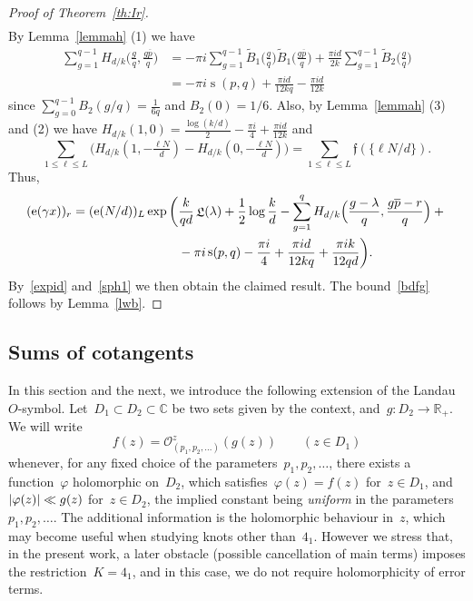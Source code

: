 \documentclass[11pt]{amsart}
\newcommand{\vphi}{\varphi}
\newcommand{\R}{\mathbb{R}}
\newcommand{\C}{\mathbb{C}}
\newcommand{\lf}{{\mathfrak f}}
\theoremstyle{definition}
\newcommand{\pr}[1]{\mathchoice{\left( #1\right)}{(#1)}{(#1)}{(#1)}}
\newcommand{\e}[1][]{\ifthenelse{\equal{#1}{}}{{\rm e}}{\operatorname{e}\pr{ #1}}}
\newcommand{\Oh}{\mathcal{O}}
\DeclareMathOperator{\Lie}{{\mathfrak L}}
\DeclareMathOperator{\deks}{s}
\newcommand{\1}{{\mathbf 1}}
\newcommand{\abs}[1]{\left|#1\right|}
\renewcommand{\bar}[1]{\overline{#1}}
\let\originalleft\left
\let\originalright\right
\renewcommand{\left}{\mathopen{}\mathclose\bgroup\originalleft}
\renewcommand{\right}{\aftergroup\egroup\originalright}
\numberwithin{equation}{section}
\begin{document}
\begin{proof}[Proof of Theorem~\ref{th:Ir}]
\begin{align*}
  \end{align*}
  By Lemma~\ref{lemmah} (1) we have
  \begin{align*}
    \sum_{g=1}^{q-1} H_{d/k}\Big(\frac gq, \frac{g\bar{p}}q\Big)&=-\pi i \sum_{g=1}^{q-1} \tilde B_1\Big(\frac gq\Big)\tilde B_1\Big( \frac{g\bar{p}}q\Big)+\frac{\pi i d}{2 k} \sum_{g=1}^{q-1}\tilde B_2\Big(\frac gq\Big)\\
    &=-\pi i \deks(p,q)+\frac{\pi i d}{12 kq}-\frac{\pi i d}{12 k}
  \end{align*}
  since $\sum_{g=0}^{q-1}B_2(g/q)=\frac{1}{6q}$ and $B_2(0)=1/6$. Also, by Lemma~\ref{lemmah} (3) and (2) we have
  $H_{d/k}(1, 0)=  \frac{\log(  k/d) }{2 }-   \frac{\pi  i   }{4  } + \frac{ \pi i d}{12k}$ and
  \[
    \sum_{1\leq \ell  \leq L} \Big(H_{d/k}(1, -\tfrac{\ell N}d) - H_{d/k}(0, -\tfrac{\ell N}d)\Big)= \sum_{1\leq \ell  \leq L}\lf(\{{\ell N}/{d}\}).
  \]
  Thus, 
  \begin{align*}   (\e[\gamma x])_r={} (\e[N/d])_L\exp\bigg(&\frac k{qd}  \Lie(\lambda)+\frac12 \log\frac kd  - \sum_{g=1}^q H_{d/k}\Big(\frac{g-\lambda}q, \frac{g\bar{p}-r}q\Big)+{}\\
    &-\pi i \deks(p,q)-\frac{\pi i }4+\frac{\pi i d}{12 kq}+\frac{\pi i k }{12 qd} \bigg).
  \end{align*}
  By~\eqref{expid} and~\eqref{sph1} we then obtain the claimed result. The bound~\eqref{bdfg} follows by Lemma~\ref{lwb}.
\end{proof}


\subsection{Sums of cotangents}


In this section and the next, we introduce the following extension of the Landau~$O$-symbol. Let~$D_1\subset D_2\subset \C$ be two sets given by the context, and~$g: D_2 \to \R_+$. We will write
\begin{equation}
  f(z) = \Oh_{(p_1, p_2, \dotsc)}^z(g(z)) \qquad (z\in D_1)\label{eq:def-Oh}
\end{equation}
whenever, for any fixed choice of the parameters~$p_1, p_2, \dotsc$, there exists a function~$\varphi$ holomorphic on~$D_2$, which satisfies~$\vphi(z) = f(z)$ for~$z\in D_1$, and~$\abs{\vphi(z)}\ll g(z)$ for~$z\in D_2$, the implied constant being \textit{uniform} 
in the parameters~$p_1, p_2, \dotsc$.
The additional information is the holomorphic behaviour in~$z$, which may become useful when studying knots other than~$4_1$. However we stress that, in the present work, a later obstacle (possible cancellation of main terms) imposes the restriction~$K = 4_1$, and in this case, we do not require holomorphicity of error terms.
\end{document}

